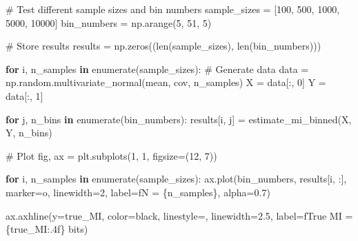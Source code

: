 \documentclass[
  11pt,
  letterpaper,
  oneside,
  openany]{book}
\newenvironment{Shaded}{\begin{snugshade}}{\end{snugshade}}
\newcommand{\BuiltInTok}[1]{\textcolor[rgb]{0.00,0.23,0.31}{#1}}
\newcommand{\CommentTok}[1]{\textcolor[rgb]{0.37,0.37,0.37}{#1}}
\newcommand{\ControlFlowTok}[1]{\textcolor[rgb]{0.00,0.23,0.31}{\textbf{#1}}}
\newcommand{\DecValTok}[1]{\textcolor[rgb]{0.68,0.00,0.00}{#1}}
\newcommand{\FloatTok}[1]{\textcolor[rgb]{0.68,0.00,0.00}{#1}}
\newcommand{\KeywordTok}[1]{\textcolor[rgb]{0.00,0.23,0.31}{\textbf{#1}}}
\newcommand{\NormalTok}[1]{\textcolor[rgb]{0.00,0.23,0.31}{#1}}
\newcommand{\OperatorTok}[1]{\textcolor[rgb]{0.37,0.37,0.37}{#1}}
\newcommand{\SpecialCharTok}[1]{\textcolor[rgb]{0.37,0.37,0.37}{#1}}
\newcommand{\SpecialStringTok}[1]{\textcolor[rgb]{0.13,0.47,0.30}{#1}}
\newcommand{\StringTok}[1]{\textcolor[rgb]{0.13,0.47,0.30}{#1}}
\begin{document}
\begin{Shaded}
\begin{Highlighting}[]
\CommentTok{\# Test different sample sizes and bin numbers}
\NormalTok{sample\_sizes }\OperatorTok{=}\NormalTok{ [}\DecValTok{100}\NormalTok{, }\DecValTok{500}\NormalTok{, }\DecValTok{1000}\NormalTok{, }\DecValTok{5000}\NormalTok{, }\DecValTok{10000}\NormalTok{]}
\NormalTok{bin\_numbers }\OperatorTok{=}\NormalTok{ np.arange(}\DecValTok{5}\NormalTok{, }\DecValTok{51}\NormalTok{, }\DecValTok{5}\NormalTok{)}

\CommentTok{\# Store results}
\NormalTok{results }\OperatorTok{=}\NormalTok{ np.zeros((}\BuiltInTok{len}\NormalTok{(sample\_sizes), }\BuiltInTok{len}\NormalTok{(bin\_numbers)))}

\ControlFlowTok{for}\NormalTok{ i, n\_samples }\KeywordTok{in} \BuiltInTok{enumerate}\NormalTok{(sample\_sizes):}
    \CommentTok{\# Generate data}
\NormalTok{    data }\OperatorTok{=}\NormalTok{ np.random.multivariate\_normal(mean, cov, n\_samples)}
\NormalTok{    X }\OperatorTok{=}\NormalTok{ data[:, }\DecValTok{0}\NormalTok{]}
\NormalTok{    Y }\OperatorTok{=}\NormalTok{ data[:, }\DecValTok{1}\NormalTok{]}
    
    \ControlFlowTok{for}\NormalTok{ j, n\_bins }\KeywordTok{in} \BuiltInTok{enumerate}\NormalTok{(bin\_numbers):}
\NormalTok{        results[i, j] }\OperatorTok{=}\NormalTok{ estimate\_mi\_binned(X, Y, n\_bins)}

\CommentTok{\# Plot}
\NormalTok{fig, ax }\OperatorTok{=}\NormalTok{ plt.subplots(}\DecValTok{1}\NormalTok{, }\DecValTok{1}\NormalTok{, figsize}\OperatorTok{=}\NormalTok{(}\DecValTok{12}\NormalTok{, }\DecValTok{7}\NormalTok{))}

\ControlFlowTok{for}\NormalTok{ i, n\_samples }\KeywordTok{in} \BuiltInTok{enumerate}\NormalTok{(sample\_sizes):}
\NormalTok{    ax.plot(bin\_numbers, results[i, :], marker}\OperatorTok{=}\StringTok{\textquotesingle{}o\textquotesingle{}}\NormalTok{, linewidth}\OperatorTok{=}\DecValTok{2}\NormalTok{,}
\NormalTok{            label}\OperatorTok{=}\SpecialStringTok{f\textquotesingle{}N = }\SpecialCharTok{\{}\NormalTok{n\_samples}\SpecialCharTok{\}}\SpecialStringTok{\textquotesingle{}}\NormalTok{, alpha}\OperatorTok{=}\FloatTok{0.7}\NormalTok{)}

\NormalTok{ax.axhline(y}\OperatorTok{=}\NormalTok{true\_MI, color}\OperatorTok{=}\StringTok{\textquotesingle{}black\textquotesingle{}}\NormalTok{, linestyle}\OperatorTok{=}\StringTok{\textquotesingle{}{-}{-}\textquotesingle{}}\NormalTok{, linewidth}\OperatorTok{=}\FloatTok{2.5}\NormalTok{,}
\NormalTok{           label}\OperatorTok{=}\SpecialStringTok{f\textquotesingle{}True MI = }\SpecialCharTok{\{}\NormalTok{true\_MI}\SpecialCharTok{:.4f\}}\SpecialStringTok{ bits\textquotesingle{}}\NormalTok{)}


\end{Highlighting}
\end{Shaded}
\end{document}

